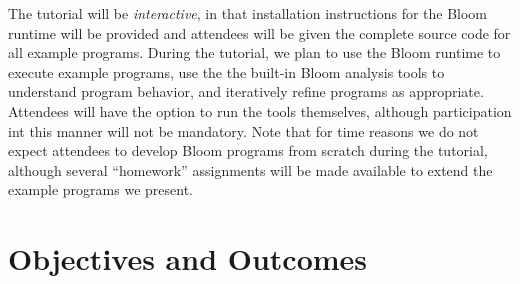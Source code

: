 The tutorial will be \emph{interactive}, in that installation instructions for
the Bloom runtime will be provided and attendees will be given the complete
source code for all example programs. During the tutorial, we plan to use the
Bloom runtime to execute example programs, use the the built-in Bloom analysis
tools to understand program behavior, and iteratively refine programs as
appropriate. Attendees will have the option to run the tools themselves,
although participation int this manner will not be mandatory. Note that for time
reasons we do not expect attendees to develop Bloom programs from scratch during
the tutorial, although several ``homework'' assignments will be made available
to extend the example programs we present.

\section{Objectives and Outcomes}

